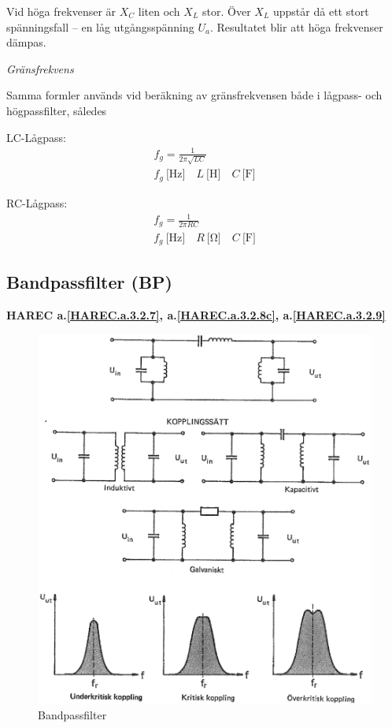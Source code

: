 Vid höga frekvenser är \(X_C\) liten och \(X_L\) stor. Över \(X_L\) uppstår då
ett stort spänningsfall -- en låg utgångsspänning \(U_a\). Resultatet blir att
höga frekvenser dämpas.

\emph{Gränsfrekvens}

Samma formler används vid beräkning av gränsfrekvensen både i lågpass- och
högpassfilter, således

LC-Lågpass:
\begin{gather*}
  f_g = \frac{1}{2π\sqrt{LC}} \\
  f_g\ \text{[Hz]} \quad L\ \text{[H]} \quad C\ \text{[F]}
\end{gather*}

RC-Lågpass:
\begin{gather*}
  f_g = \frac{1}{2π{RC}} \\
  f_g\ \text{[Hz]} \quad R\ \text{[Ω]} \quad C\ \text{[F]}
\end{gather*}

\subsection{Bandpassfilter (BP)}
\textbf{HAREC
  a.\ref{HAREC.a.3.2.7}\label{myHAREC.a.3.2.7},
  a.\ref{HAREC.a.3.2.8c}\label{myHAREC.a.3.2.8c},
  a.\ref{HAREC.a.3.2.9}\label{myHAREC.a.3.2.9c}
}

\begin{figure}
\includegraphics[width=\textwidth]{images/cropped_pdfs/bild_2_3-24.pdf}
\caption{Bandpassfilter}
\label{fig:BildII3-24}
\end{figure}

